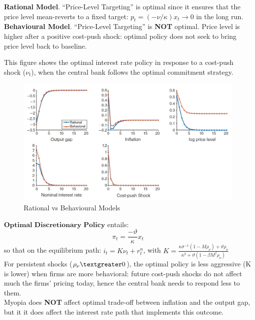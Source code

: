 \documentclass{beamer}
\begin{document}
\begin{frame}{\subsecname}
    \textbf{Rational Model}. “Price-Level Targeting” is optimal since it ensures that the price level mean-reverts to a fixed target: $p_{t}=(-\nu/\kappa)x_{t}\to0$ in the long run.\\
    \hfill \linebreak    
    \textbf{Behavioural Model}. “Price-Level Targeting” is \textbf{NOT} optimal. Price level is higher after a positive cost-push shock: optimal policy does not seek to bring price level back to baseline.\\    
\end{frame}

\begin{frame}{\subsecname}
    This figure shows the optimal interest rate policy in response to a cost-push shock ($\nu_{t}$), when the central bank follows the optimal commitment strategy.    
    \begin{figure}
        \centering
        \includegraphics[scale=0.6]{Graphs_Macro/Figure3.JPG}
        \caption{Rational vs Behavioural Models}
        \label{fig:3}
    \end{figure}
\end{frame}

\begin{frame}{\subsecname}
    $\textbf{Optimal Discretionary Policy}$ entails:
    \begin{equation}\tag{42}
        \pi_{t}=\frac{-\vartheta}{\kappa}x_{t}
    \end{equation}
    so that on the equilibrium path: $i_{t}=K\nu_{t}+r_{t}^{n}$, with $K=\frac{\kappa\sigma^{-1}\left(1-M\rho_{\nu}\right)+\vartheta\rho_{\nu}}{\kappa^{2}+\vartheta\left(1-\beta M^{f}\rho_{\nu}\right)}$\\
    \hfill \linebreak
    For persistent shocks ($\rho_{\nu} \textgreater 0$), the optimal policy is less aggressive (K is lower) when firms are more behavioral: future cost-push shocks do not affect much the firms’ pricing today, hence the central bank needs to respond less to them.\\
    \hfill \linebreak      
    Myopia does \textbf{NOT} affect optimal trade-off between inflation and the output gap, but it it does affect the interest rate path that implements this outcome.
\end{frame}
\end{document}

